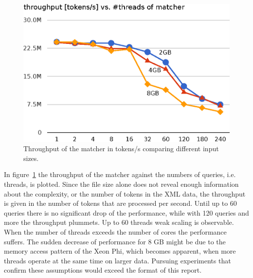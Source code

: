 \begin{figure}[h]\centering
  \includegraphics[scale=.66]{img/matcher_throughput_2.eps}
  \caption{Throughput of the matcher in tokens/s comparing different input sizes. \label{matcher_throughput}}
\end{figure}
In figure~\ref{matcher_throughput} the throughput of the matcher against the numbers of queries, i.e. threads, is plotted. Since the file size alone does not reveal enough information about the complexity, or the number of tokens in the XML data, the throughput is given in the number of tokens that are processed per second. Until up to 60 queries there is no significant drop of the performance, while with 120 queries and more the throughput plummets. Up to 60 threads weak scaling is observable. When the number of threads exceeds the number of cores the performance suffers. The sudden decrease of performance for 8 GB might be due to the memory access pattern of the Xeon Phi, which becomes apparent, when more threads operate at the same time on larger data. Pursuing experiments that confirm these assumptions would exceed the format of this report. 

